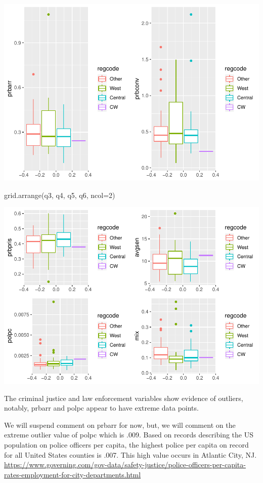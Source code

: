\documentclass[]{article}
\newenvironment{Shaded}{}{}
\newcommand{\DataTypeTok}[1]{#1}
\newcommand{\DecValTok}[1]{#1}
\newcommand{\KeywordTok}[1]{\textcolor[rgb]{0.00,0.00,1.00}{#1}}
\newcommand{\NormalTok}[1]{#1}
\begin{document}
\includegraphics{Bagnard_Gaustad_Hartman_Leung_Lab_3_files/figure-latex/unnamed-chunk-22-1.pdf}

\begin{Shaded}
\begin{Highlighting}[]
\KeywordTok{grid.arrange}\NormalTok{(q3, q4, q5, q6, }\DataTypeTok{ncol=}\DecValTok{2}\NormalTok{)}
\end{Highlighting}
\end{Shaded}

\includegraphics{Bagnard_Gaustad_Hartman_Leung_Lab_3_files/figure-latex/unnamed-chunk-22-2.pdf}

The criminal justice and law enforcement variables show evidence of
outliers, notably, prbarr and polpc appear to have extreme data points.

We will suspend comment on prbarr for now, but, we will comment on the
extreme outlier value of polpc which is .009. Based on records
describing the US population on police officers per capita, the highest
police per capita on record for all United States counties is .007. This
high value occurs in Atlantic City, NJ.
\url{https://www.governing.com/gov-data/safety-justice/police-officers-per-capita-rates-employment-for-city-departments.html}
\end{document}
